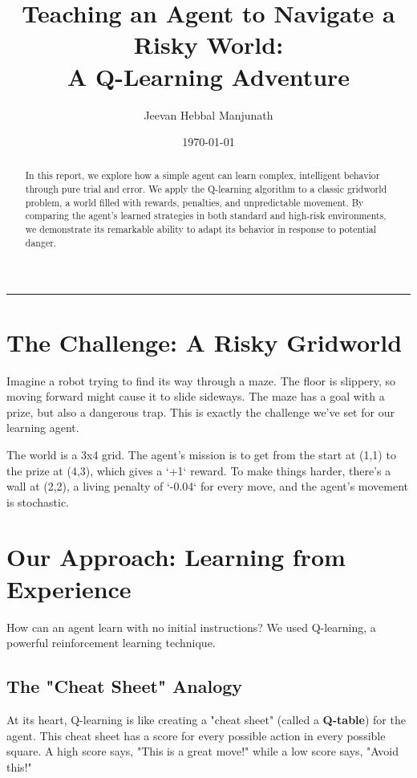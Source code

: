 \documentclass[11pt, a4paper]{article}
\title{\textbf{Teaching an Agent to Navigate a Risky World: \\ A Q-Learning Adventure}}
\author{Jeevan Hebbal Manjunath}
\date{\today}
\begin{document}
\maketitle

\begin{abstract}
In this report, we explore how a simple agent can learn complex, intelligent behavior through pure trial and error. We apply the Q-learning algorithm to a classic gridworld problem, a world filled with rewards, penalties, and unpredictable movement. By comparing the agent's learned strategies in both standard and high-risk environments, we demonstrate its remarkable ability to adapt its behavior in response to potential danger.
\end{abstract}

\hrule
\vspace{1em}

\section{The Challenge: A Risky Gridworld}
Imagine a robot trying to find its way through a maze. The floor is slippery, so moving forward might cause it to slide sideways. The maze has a goal with a prize, but also a dangerous trap. This is exactly the challenge we've set for our learning agent.

The world is a 3x4 grid. The agent's mission is to get from the start at (1,1) to the prize at (4,3), which gives a `+1` reward. To make things harder, there's a wall at (2,2), a living penalty of `-0.04` for every move, and the agent's movement is stochastic.

\section{Our Approach: Learning from Experience}
How can an agent learn with no initial instructions? We used Q-learning, a powerful reinforcement learning technique.

\subsection{The "Cheat Sheet" Analogy}
At its heart, Q-learning is like creating a "cheat sheet" (called a \textbf{Q-table}) for the agent. This cheat sheet has a score for every possible action in every possible square. A high score says, "This is a great move!" while a low score says, "Avoid this!"
\end{document}
